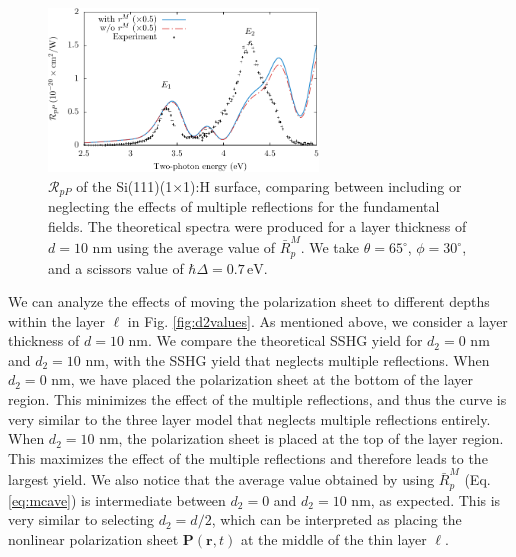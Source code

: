 \begin{figure}[H]
\centering
\includegraphics[width=0.64\textwidth]{content/figures/fig-Si1x1-MRno1w}
\caption[Including or neglecting the effects of multiple reflections for the
fundamental fields] {$\mathcal{R}_{pP}$ of the Si(111)(1$\times$1):H surface,
comparing between including or neglecting the effects of multiple reflections
for the fundamental fields. The theoretical spectra were produced for a layer
thickness of $d = 10$ nm using the average value of $\bar{R}^{M}_{p}$. We take
$\theta=65^{\circ}$, $\phi=30^{\circ}$, and a scissors value of $\hbar\Delta =
0.7\,\text{eV}$.}
\label{fig:mr21w}
\end{figure}

We can analyze the effects of moving the polarization sheet to different depths
within the layer $\ell$ in Fig. \ref{fig:d2values}. As mentioned above, we
consider a layer thickness of $d = 10$ nm. We compare the theoretical SSHG yield
for $d_{2} = 0$ nm and $d_{2} = 10$ nm, with the SSHG yield that neglects
multiple reflections. When $d_{2} = 0$ nm, we have placed the polarization sheet
at the bottom of the layer region. This minimizes the effect of the multiple
reflections, and thus the curve is very similar to the three layer model that
neglects multiple reflections entirely. When $d_{2} = 10$ nm, the polarization
sheet is placed at the top of the layer region. This maximizes the effect of the
multiple reflections and therefore leads to the largest yield. We also notice
that the average value obtained by using $\bar{R}^{M}_{p}$ (Eq.
\eqref{eq:mcave}) is intermediate between $d_{2} = 0$ and $d_{2} = 10$ nm, as
expected. This is very similar to selecting $d_{2} = d/2$, which can be
interpreted as placing the nonlinear polarization sheet
$\mathbf{P}(\mathbf{r},t)$ at the middle of the thin layer $\ell$.

